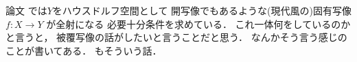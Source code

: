 \documentclass[leqno, a4paper, 12pt]{jsarticle}
\begin{document}
論文
\cite{MR0370471}
では$Y$をハウスドルフ空間として
開写像でもあるような(現代風の)固有写像$f\colon X\to Y$
が全射になる
必要十分条件を求めている．
これ一体何をしているのかと言うと，
被覆写像の話がしたいと言うことだと思う．
なんかそう言う感じのことが書いてある．
\cite{MR1966988}
もそういう話．

\nocite{*}


\end{document}
